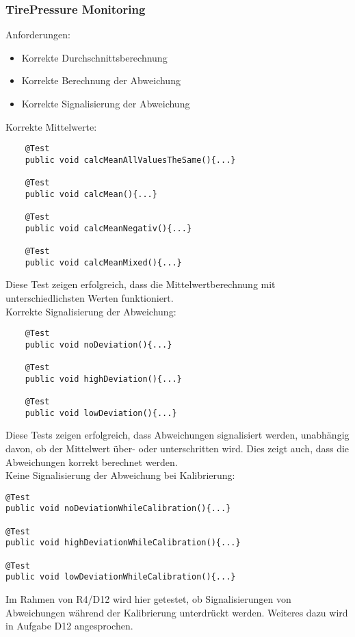 \subsubsection{TirePressure Monitoring}
Anforderungen:
\begin{itemize}
	\item Korrekte Durchschnittsberechnung
	\item Korrekte Berechnung der Abweichung
	\item Korrekte Signalisierung der Abweichung
\end{itemize}

Korrekte Mittelwerte:
\begin{lstlisting}
	@Test
    public void calcMeanAllValuesTheSame(){...}
    
    @Test
    public void calcMean(){...}
    
    @Test
    public void calcMeanNegativ(){...}
    
    @Test
    public void calcMeanMixed(){...}
\end{lstlisting}
Diese Test zeigen erfolgreich, dass die Mittelwertberechnung mit unterschiedlichsten Werten funktioniert.\\

Korrekte Signalisierung der Abweichung:
\begin{lstlisting}
	@Test
	public void noDeviation(){...}
	
	@Test
	public void highDeviation(){...}
	
	@Test
	public void lowDeviation(){...}
\end{lstlisting}
Diese Tests zeigen erfolgreich, dass Abweichungen signalisiert werden, unabhängig davon, ob der Mittelwert über- oder unterschritten wird. Dies zeigt auch, dass die Abweichungen korrekt berechnet werden.\\

Keine Signalisierung der Abweichung bei Kalibrierung:
\begin{lstlisting}
@Test
public void noDeviationWhileCalibration(){...}

@Test
public void highDeviationWhileCalibration(){...}

@Test
public void lowDeviationWhileCalibration(){...}
\end{lstlisting}Im Rahmen von R4/D12 wird hier getestet, ob Signalisierungen von Abweichungen während der Kalibrierung unterdrückt werden. Weiteres dazu wird in Aufgabe D12 angesprochen.

